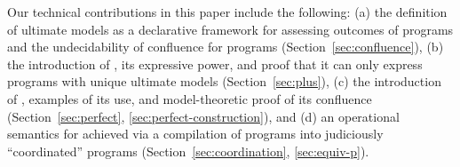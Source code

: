 Our technical contributions in this paper include the following: (a) the
definition of ultimate models as a declarative framework for assessing outcomes of \lang programs and the undecidability of confluence for \lang programs (Section~\ref{sec:confluence}), (b) the introduction of \slang, its expressive power, and proof that it can only express programs with unique ultimate models (Section~\ref{sec:plus}), (c) the introduction of \plang, examples of its use, and model-theoretic proof of its confluence (Section~\ref{sec:perfect}, \ref{sec:perfect-construction}), and (d) an operational semantics for \plang achieved via a compilation of \plang programs into judiciously ``coordinated'' \lang programs (Section~\ref{sec:coordination}, \ref{sec:equiv-p}).

% 
% 
% 
